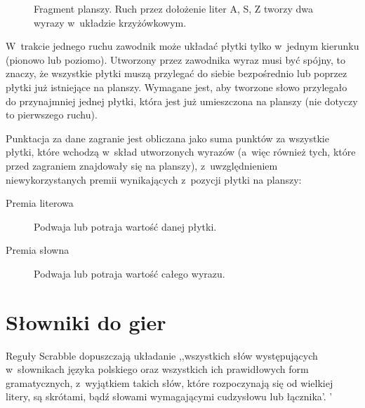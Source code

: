 \documentclass[a4paper,twocolumn,12pt]{article}
\begin{document}
\begin{figure}[ht!]
\begin{center}
		\caption{Fragment planszy. Ruch przez dołożenie liter A, S, Z tworzy dwa wyrazy w~układzie krzyżówkowym.}
		\label{fig:crossword_second}
	\end{center}
\end{figure}

W~trakcie jednego ruchu zawodnik może układać płytki tylko w~jednym kierunku (pionowo lub poziomo). Utworzony przez zawodnika wyraz musi być spójny, to znaczy, że wszystkie płytki muszą przylegać do siebie bezpośrednio lub poprzez płytki już istniejące na planszy. Wymagane jest, aby tworzone słowo przylegało do przynajmniej jednej płytki, która jest już umieszczona na planszy (nie dotyczy to pierwszego ruchu).

Punktacja za dane zagranie jest obliczana jako suma punktów za wszystkie płytki, które wchodzą w~skład utworzonych wyrazów (a~więc również tych, które przed zagraniem znajdowały się na planszy), z~uwzględnieniem niewykorzystanych premii wynikających z~pozycji płytki na planszy:

\begin{description}
 \item [Premia literowa] Podwaja lub potraja wartość danej płytki.
 \item [Premia słowna] Podwaja lub potraja wartość całego wyrazu.
\end{description}

\section*{Słowniki do gier}

Reguły Scrabble dopuszczają układanie ,,wszystkich słów występujących w~słownikach języka polskiego oraz wszystkich ich prawidłowych form gramatycznych, z~wyjątkiem takich słów, które rozpoczynają się od wielkiej litery, są skrótami, bądź słowami wymagającymi cudzysłowu lub łącznika'. '\cite{scrabble_word_rules} 
\end{document}
